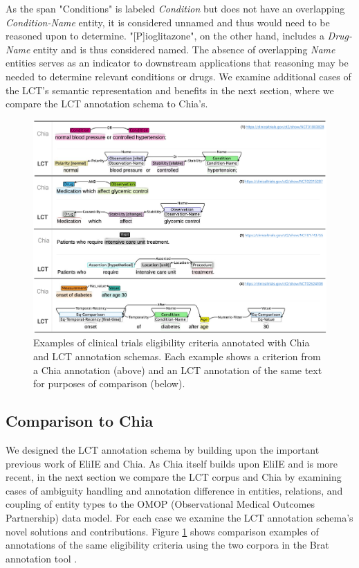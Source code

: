 \documentclass[../main.tex]{subfiles}
\begin{document}
\noindent As the span "Conditions" is labeled \textit{Condition} but does not have an overlapping \textit{Condition-Name} entity, it is considered unnamed and thus would need to be reasoned upon to determine. "[P]ioglitazone", on the other hand, includes a \textit{Drug-Name} entity and is thus considered named. The absence of overlapping \textit{Name} entities serves as an indicator to downstream applications that reasoning may be needed to determine relevant conditions or drugs. We examine additional cases of the LCT's semantic representation and benefits in the next section, where we compare the LCT annotation schema to Chia's.

\begin{figure}[ht!]
  \includegraphics[scale=0.56]{figs/chia_vs_lct.pdf}  
    \caption{Examples of clinical trials eligibility criteria annotated with Chia and LCT annotation schemas. Each example shows a criterion from a Chia annotation (above) and an LCT annotation of the same text for purposes of comparison (below).}
    \label{fig_chia_vs_lct}
\end{figure}

\subsection*{Comparison to Chia}
We designed the LCT annotation schema by building upon the important previous work of EliIE and Chia. As Chia itself builds upon EliIE and is more recent, in the next section we compare the LCT corpus and Chia by examining cases of ambiguity handling and annotation difference in entities, relations, and coupling of entity types to the OMOP \cite{hripcsak2015observational} (Observational Medical Outcomes Partnership) data model. For each case we examine the LCT annotation schema's novel solutions and contributions. Figure \ref{fig_chia_vs_lct} shows comparison examples of annotations of the same eligibility criteria using the two corpora in the Brat annotation tool \cite{stenetorp2012brat}.
\end{document}
